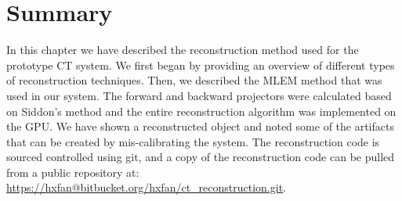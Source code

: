 \section{Summary}
In this chapter we have described the reconstruction method used for the prototype CT system.  We first began by providing an overview of different types of reconstruction techniques.  Then, we described the MLEM method that was used in our system.  The forward and backward projectors were calculated based on Siddon's method and the entire reconstruction algorithm was implemented on the GPU.  We have shown a reconstructed object and noted some of the artifacts that can be created by mis-calibrating the system.  The reconstruction code is sourced controlled using git, and a copy of the reconstruction code can be pulled from a public repository at: \url{https://hxfan@bitbucket.org/hxfan/ct_reconstruction.git}.




%




